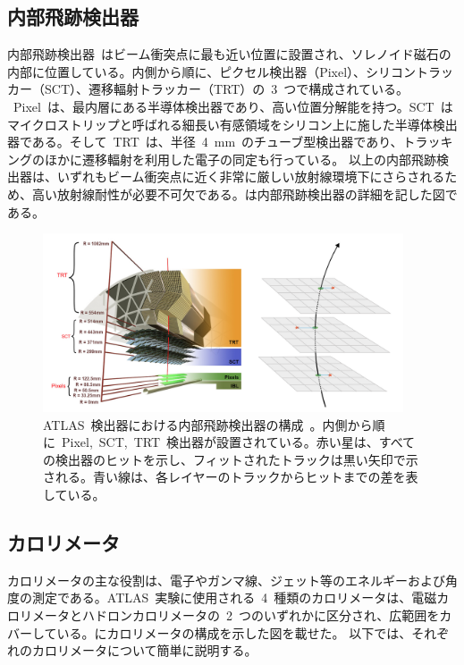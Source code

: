 \subsection{内部飛跡検出器}
内部飛跡検出器~\cite{URL:19}はビーム衝突点に最も近い位置に設置され、ソレノイド磁石の内部に位置している。内側から順に、ピクセル検出器（Pixel）、シリコントラッカー（SCT）、遷移輻射トラッカー（TRT）の~3~つで構成されている。
~Pixel~は、最内層にある半導体検出器であり、高い位置分解能を持つ。SCT~はマイクロストリップと呼ばれる細長い有感領域をシリコン上に施した半導体検出器である。そして~TRT~は、半径~4~mm~のチューブ型検出器であり、トラッキングのほかに遷移輻射を利用した電子の同定も行っている。
以上の内部飛跡検出器は、いずれもビーム衝突点に近く非常に厳しい放射線環境下にさらされるため、高い放射線耐性が必要不可欠である。は内部飛跡検出器の詳細を記した図である。

\begin{figure}[H]
    \centering   
    \includegraphics[width=0.95\textwidth,page=1]{img/jpeg/IDbriefing_figure1.png}
    \caption[ATLAS~検出器における内部飛跡検出器の構成]{ATLAS~検出器における内部飛跡検出器の構成~\cite{URL:19}。内側から順に~Pixel,~SCT,~TRT~検出器が設置されている。赤い星は、すべての検出器のヒットを示し、フィットされたトラックは黒い矢印で示される。青い線は、各レイヤーのトラックからヒットまでの差を表している。}\label{fig:innr}
\end{figure}

\subsection{カロリメータ}
カロリメータの主な役割は、電子やガンマ線、ジェット等のエネルギーおよび角度の測定である。ATLAS~実験に使用される~4~種類のカロリメータは、電磁カロリメータとハドロンカロリメータの~2~つのいずれかに区分され、広範囲をカバーしている。にカロリメータの構成を示した図を載せた。
以下では、それぞれのカロリメータについて簡単に説明する。

